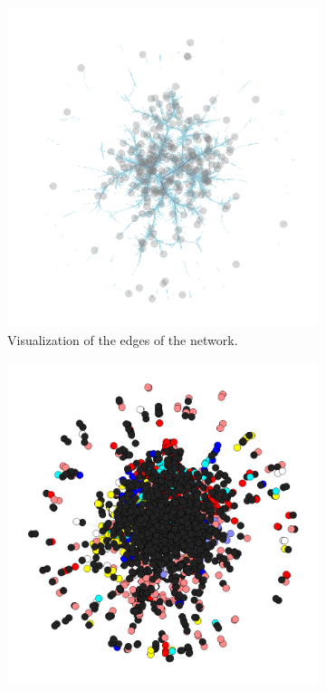\begin{figure}
	\centering
	\begin{subfigure}{0.32\textwidth} %
		\includegraphics[width=\textwidth]{media/edges.png}
		\caption{Visualization of the edges of the network.} %
        \label{fig:dataset_edges}
	\end{subfigure}
	\vspace{1em} %
	\begin{subfigure}{0.32\textwidth} %
		\includegraphics[width=\textwidth]{media/labels_only_train.png}

\end{subfigure}
\end{figure}
